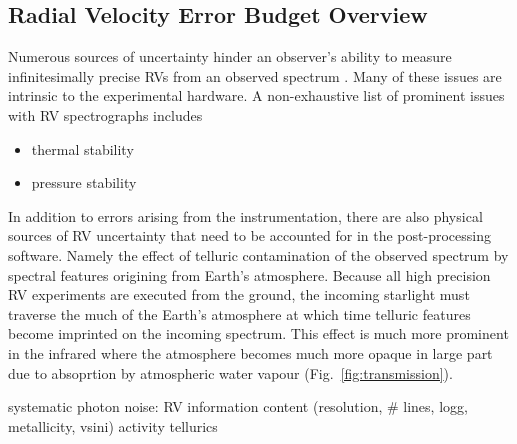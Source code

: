 \subsection{Radial Velocity Error Budget Overview}
Numerous sources of uncertainty hinder an observer's ability to measure infinitesimally precise
RVs from an observed spectrum \citep{halverson16}. Many of these issues are intrinsic to the experimental
hardware. A non-exhaustive list of prominent issues with RV spectrographs includes

\begin{itemize}
\item thermal stability
\item pressure stability
  
\end{itemize}

In addition to errors arising from the instrumentation, there are also physical sources of RV
uncertainty that need to be accounted for in the post-processing software. Namely the effect of
telluric contamination of the observed spectrum by spectral features origining from Earth's
atmosphere. Because all high precision RV experiments are executed from the ground, the incoming
starlight must traverse the much of the Earth's atmosphere at which time telluric features become
imprinted on the incoming spectrum. This effect is much more prominent in the infrared where
the atmosphere becomes much more opaque in large part due to absoprtion by atmospheric water vapour
(Fig.~\ref{fig:transmission}).

systematic
photon noise: RV information content (resolution, \# lines, logg, metallicity, vsini)
activity
tellurics


